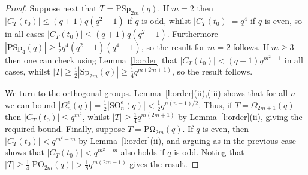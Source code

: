 \documentclass[twoside,a4paper,reqno,11pt]{amsart}
\newcommand{\<}{\langle}
\renewcommand{\>}{\rangle}
\newcommand{\leqs}{\leqslant}
\newcommand{\geqs}{\geqslant}
\newcommand{\Aut}{\mathrm{Aut}}
\newcommand{\PSp}{\mathrm{PSp}}
\newcommand{\Sp}{\mathrm{Sp}}
\newcommand{\POmega}{\mathrm{P\Omega}}
\theoremstyle{definition}
\begin{document}
\begin{proof}
Suppose next that $T = \PSp_{2m}(q)$. If $m = 2$ then $|C_T(t_0)| \leqs   (q + 1)q(q^2-1)$ if $q$ is odd, whilst $|C_T(t_0)| = q^4$ if $q$ is even, so
in all cases $|C_T(t_0)| \leqs (q+1)q(q^2-1)$. Furthermore $|\PSp_4(q)| \geqs\frac{1}{2}q^4(q^2-1)(q^4-1)$, so the result for $m = 2$ follows.
If $m\geqs 3$ then one can check using Lemma~\ref{l:order} that $|C_T(t_0)| < (q+1)q^{m^2-1}$ in all cases, whilst $|T| \geqs \frac{1}{2}|\Sp_{2m}(q)| \geqs\frac{1}{4}q^{m(2m+1)}$, so the result follows. 

We turn to the orthogonal groups. Lemma~\ref{l:order}(ii),(iii) shows that for all $n$ we can bound $|\Omega_{n}^\epsilon(q)| = \frac{1}{2}|\mathrm{SO}_{n}^\epsilon(q)| < \frac{1}{2}q^{n(n-1)/2}$. Thus, if $T = \Omega_{2m+1}(q)$ then $|C_T(t_0)| \leqs q^{m^2}$, whilst $|T| \geqs \frac{1}{4}q^{m(2m+1)}$ by Lemma~\ref{l:order}(ii), giving the required bound.
Finally, suppose $T = \POmega_{2m}^-(q)$. %
If $q$ is even, then $|C_T(t_0)| < q^{m^2-m}$ by 
Lemma~\ref{l:order}(ii), and arguing as in the previous case shows that $|C_T(t_0)| < q^{m^2-m}$ also holds if $q$ is odd. Noting that $|T| \geqs \frac{1}{4}|\mathrm{PO}^-_{2m}(q)| > \frac{1}{8}q^{m(2m-1)}$ gives the result. 
\end{proof}
\end{document}
